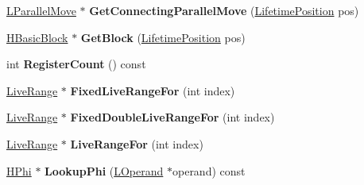 \begin{DoxyCompactItemize}
\item 
\hyperlink{classv8_1_1internal_1_1_l_parallel_move}{L\+Parallel\+Move} $\ast$ {\bfseries Get\+Connecting\+Parallel\+Move} (\hyperlink{classv8_1_1internal_1_1_lifetime_position}{Lifetime\+Position} pos)\hypertarget{classv8_1_1internal_1_1_b_a_s_e___e_m_b_e_d_d_e_d_ad0c3a79d6614f420ab1b45c761ba77c9}{}\label{classv8_1_1internal_1_1_b_a_s_e___e_m_b_e_d_d_e_d_ad0c3a79d6614f420ab1b45c761ba77c9}

\item 
\hyperlink{classv8_1_1internal_1_1_h_basic_block}{H\+Basic\+Block} $\ast$ {\bfseries Get\+Block} (\hyperlink{classv8_1_1internal_1_1_lifetime_position}{Lifetime\+Position} pos)\hypertarget{classv8_1_1internal_1_1_b_a_s_e___e_m_b_e_d_d_e_d_ad9339f996f74762dbb7de770899b7ad0}{}\label{classv8_1_1internal_1_1_b_a_s_e___e_m_b_e_d_d_e_d_ad9339f996f74762dbb7de770899b7ad0}

\item 
int {\bfseries Register\+Count} () const \hypertarget{classv8_1_1internal_1_1_b_a_s_e___e_m_b_e_d_d_e_d_ab83d3fa8c274b85c800e126527b2709e}{}\label{classv8_1_1internal_1_1_b_a_s_e___e_m_b_e_d_d_e_d_ab83d3fa8c274b85c800e126527b2709e}

\item 
\hyperlink{classv8_1_1internal_1_1_live_range}{Live\+Range} $\ast$ {\bfseries Fixed\+Live\+Range\+For} (int index)\hypertarget{classv8_1_1internal_1_1_b_a_s_e___e_m_b_e_d_d_e_d_a11212d0d310f15dcb54e799effe19e76}{}\label{classv8_1_1internal_1_1_b_a_s_e___e_m_b_e_d_d_e_d_a11212d0d310f15dcb54e799effe19e76}

\item 
\hyperlink{classv8_1_1internal_1_1_live_range}{Live\+Range} $\ast$ {\bfseries Fixed\+Double\+Live\+Range\+For} (int index)\hypertarget{classv8_1_1internal_1_1_b_a_s_e___e_m_b_e_d_d_e_d_ae75aaae9717afc659b466116a4b6146a}{}\label{classv8_1_1internal_1_1_b_a_s_e___e_m_b_e_d_d_e_d_ae75aaae9717afc659b466116a4b6146a}

\item 
\hyperlink{classv8_1_1internal_1_1_live_range}{Live\+Range} $\ast$ {\bfseries Live\+Range\+For} (int index)\hypertarget{classv8_1_1internal_1_1_b_a_s_e___e_m_b_e_d_d_e_d_a6dafdee09e4b178c82a4a99561b1221e}{}\label{classv8_1_1internal_1_1_b_a_s_e___e_m_b_e_d_d_e_d_a6dafdee09e4b178c82a4a99561b1221e}

\item 
\hyperlink{classv8_1_1internal_1_1_h_phi}{H\+Phi} $\ast$ {\bfseries Lookup\+Phi} (\hyperlink{classv8_1_1internal_1_1_l_operand}{L\+Operand} $\ast$operand) const \hypertarget{classv8_1_1internal_1_1_b_a_s_e___e_m_b_e_d_d_e_d_a909a7b65ff12d86f756af06383d295e0}{}\label{classv8_1_1internal_1_1_b_a_s_e___e_m_b_e_d_d_e_d_a909a7b65ff12d86f756af06383d295e0}


\end{DoxyCompactItemize}
